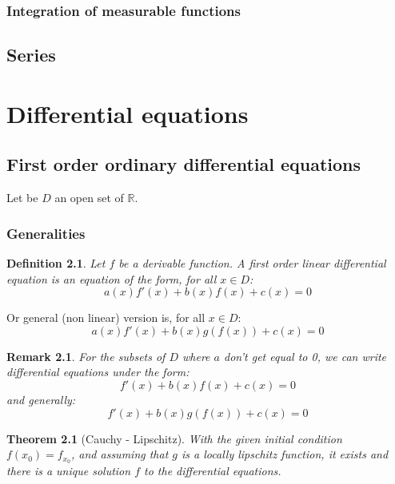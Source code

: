 \documentclass[french,12pt,a4paper]{book}
\newcommand{\R}{\mathbb{R}}
\newtheorem{theo}{Theorem}[chapter]
\newtheorem{defin}{Definition}[chapter]
\newtheorem{rem}{Remark}[chapter]
\numberwithin{equation}{chapter}
\begin{document}
\subsection{Integration of measurable functions}

\section{Series}

\chapter{Differential equations}

\section{First order ordinary differential equations}
Let be $D$ an open set of $\R$.

\subsection{Generalities}

\begin{defin}
Let $f$ be a derivable function. A first order linear differential equation is an equation of the form, for all $x \in D$:
$$a(x) f'(x) + b(x)f(x) + c(x) = 0$$
\end{defin}

Or general (non linear) version is, for all $x \in D$:
$$a(x)f'(x) +  b(x)g(f(x)) + c(x) = 0$$

\begin{rem}
For the subsets of $D$ where $a$ don't get equal to 0, we can write differential equations under the form:
$$f'(x) + b(x)f(x) + c(x) = 0$$
and generally:
$$f'(x) +  b(x)g(f(x)) + c(x) = 0$$
\end{rem}

\begin{theo}[Cauchy - Lipschitz]
With the given initial condition $f(x_0) = f_{x_0}$, and assuming that $g$ is a locally lipschitz function, it exists and there is a unique solution $f$ to the differential equations.
\end{theo}
\end{document}
